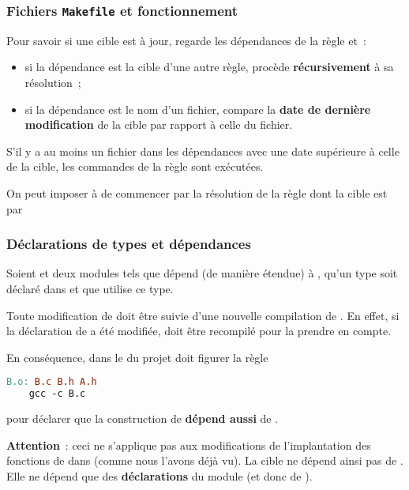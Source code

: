 \begin{frame}\frametitle{Fichiers {\tt Makefile} et fonctionnement}
Pour savoir si une cible est à jour,  regarde les dépendances
de la règle et~:
\begin{itemize}
    \item si la dépendance est la cible d'une autre règle, 
    procède {\bf récursivement} à sa résolution~;
    \smallskip

    \item si la dépendance est le nom d'un fichier,  compare
    la {\bf date de dernière modification} de la cible par rapport à
    celle du fichier.
\end{itemize}
\smallskip

S'il y a au moins un fichier dans les dépendances avec une date supérieure
à celle de la cible, les commandes de la règle sont exécutées.
\bigskip

On peut imposer à  de commencer par la résolution de la
règle dont la cible est  par
\begin{center}
\end{center}
\end{frame}

\begin{frame}[fragile]\frametitle{Déclarations de types et dépendances}
Soient  et  deux modules tels que
 dépend (de manière étendue) à , qu'un type 
soit déclaré dans  et que  utilise ce type.
\bigskip

Toute modification de  doit être suivie d'une nouvelle
compilation de . En effet, si la déclaration de  a été
modifiée,  doit être recompilé pour la prendre en compte.
\medskip

En conséquence, dans le  du projet doit figurer la règle
\begin{multicols}{2}
\begin{lstlisting}[language=make]
B.o: B.c B.h A.h
    gcc -c B.c
\end{lstlisting}
pour déclarer que la construction de  {\bf dépend aussi}
de .
\end{multicols}
\bigskip

{\bf Attention}~: ceci ne s'applique pas aux modifications de l'implantation
des fonctions de  dans  (comme nous l'avons déjà vu).
La cible  ne dépend ainsi pas de . Elle ne dépend
que des {\bf déclarations} du module  (et donc de ).
\end{frame}


